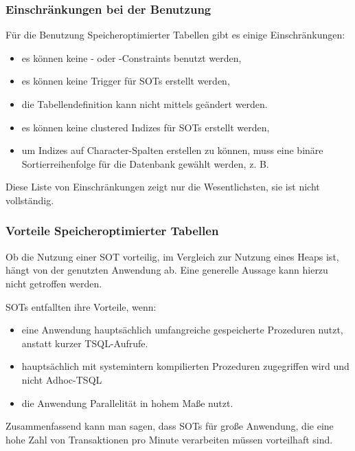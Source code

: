         \subsubsection{Einschränkungen bei der Benutzung}
          Für die Benutzung Speicheroptimierter Tabellen gibt es einige
          Einschränkungen:
          \begin{itemize}
            \item es können keine \FOREIGNKEY- oder \CHECK-Constraints benutzt
            werden,
            \item es können keine Trigger für SOTs erstellt werden,
            \item die Tabellendefinition kann nicht mittels
             geändert werden.
            \item es können keine clustered Indizes für SOTs erstellt werden,
            \item um Indizes auf Character-Spalten erstellen zu
            können, muss eine binäre Sortierreihenfolge für die Datenbank
            gewählt werden, z. B. 
          \end{itemize}
          Diese Liste von Einschränkungen zeigt nur die Wesentlichsten, sie ist
          nicht vollständig.
          \begin{literaturinternet}
            \item \cite{dn133182}
          \end{literaturinternet}
        \subsubsection{Vorteile Speicheroptimierter Tabellen}
          Ob die Nutzung einer SOT vorteilig, im Vergleich zur Nutzung eines
          Heaps ist, hängt von der genutzten Anwendung ab. Eine generelle
          Aussage kann hierzu nicht getroffen werden.
          
          SOTs entfallten ihre Vorteile, wenn:
          \begin{itemize}
            \item eine Anwendung hauptsächlich umfangreiche gespeicherte
            Prozeduren nutzt, anstatt kurzer TSQL-Aufrufe.
            \item hauptsächlich mit systemintern kompilierten Prozeduren
            zugegriffen wird und nicht Adhoc-TSQL
            \item die Anwendung Parallelität in hohem Maße nutzt.
          \end{itemize}
          Zusammenfassend kann man sagen, dass SOTs für große Anwendung, die
          eine hohe Zahl von Transaktionen pro Minute verarbeiten müssen
          vorteilhaft sind.
          \begin{literaturinternet}
            \item \cite{dn511014}
          \end{literaturinternet}         
